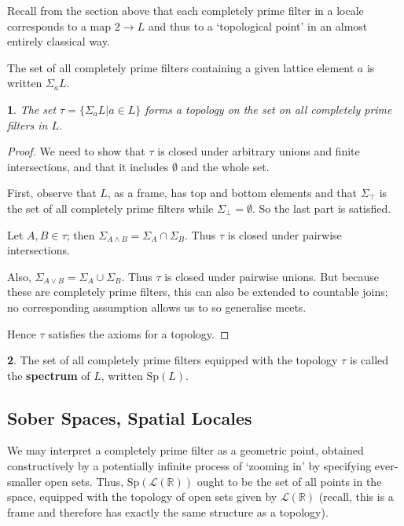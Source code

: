 \documentclass[oneside,english]{amsbook}
\numberwithin{section}{chapter}
\theoremstyle{plain}
\newtheorem{thm}{\protect\theoremname}
\theoremstyle{definition}
\newtheorem{defn}[thm]{\protect\definitionname}
\providecommand{\definitionname}{Definition}
\providecommand{\theoremname}{Theorem}
\begin{document}
Recall from the section above that each completely prime filter in a locale corresponds to a map $2\to L$ and thus to a `topological point' in an almost entirely classical way.

The set of all completely prime filters containing a given lattice element $a$ is written $\Sigma_a L$. 

\begin{thm}
	The set $\tau = \{\Sigma_a L | a\in L\}$ forms a topology on the set on all completely prime filters in $L$.
\end{thm}

\begin{proof}
	We need to show that $\tau$ is closed under arbitrary unions and finite intersections, and that it includes $\emptyset$ and the whole set. 
	
	First, observe that $L$, as a frame, has top and bottom elements and that $\Sigma_\top$ is the set of all completely prime filters while $\Sigma_\bot = \emptyset$. So the last part is satisfied.
	
	Let $A, B\in \tau$; then $\Sigma_{A\land B}  = \Sigma_A \cap \Sigma_B$. Thus $\tau$ is closed under pairwise intersections.
	
	Also, $\Sigma_{A\lor B}  = \Sigma_A \cup \Sigma_B$. Thus $\tau$ is closed under pairwise unions. But because these are completely prime filters, this can also be extended to countable joins; no corresponding assumption allows us to so generalise meets.
	
	Hence $\tau$ satisfies the axioms for a topology.
\end{proof}

\begin{defn}
	The set of all completely prime filters equipped with the topology $\tau$ is called the \textbf{spectrum} of $L$, written $\text{Sp}(L)$.
\end{defn}

\subsection{Sober Spaces, Spatial Locales}

We may interpret a completely prime filter as a geometric point, obtained constructively by a potentially infinite process of `zooming in' by specifying ever-smaller open sets. Thus, $\text{Sp}(\mathscr{L}(\mathbb{R}))$ ought to be the set of all points in the space, equipped with the topology of open sets given by $\mathscr{L}(\mathbb{R})$ (recall, this is a frame and therefore has exactly the same structure as a topology).
\end{document}

